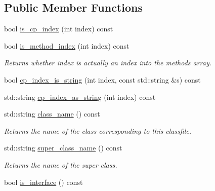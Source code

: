 \subsection*{Public Member Functions}
\begin{DoxyCompactItemize}
\item 
bool \hyperlink{classClassFileImpl_a1f15226f5107cb036e81d480531cda08}{is\+\_\+cp\+\_\+index} (int index) const
\item 
\mbox{\label{classClassFileImpl_ad8f4fcb051aa9d8c04d67373abe12c43}} 
bool \hyperlink{classClassFileImpl_ad8f4fcb051aa9d8c04d67373abe12c43}{is\+\_\+method\+\_\+index} (int index) const
\begin{DoxyCompactList}\small\item\em Returns whether {\ttfamily index} is actually an index into the methods array. \end{DoxyCompactList}\item 
bool \hyperlink{classClassFileImpl_ab84cd50d25d163274a299ba682f57610}{cp\+\_\+index\+\_\+is\+\_\+string} (int index, const std\+::string \&s) const
\item 
std\+::string \hyperlink{classClassFileImpl_abf8923075c93d6d5bd1755a7b3ced362}{cp\+\_\+index\+\_\+as\+\_\+string} (int index) const
\item 
\mbox{\label{classClassFileImpl_a6b505e3750863370ca70c708d051a00c}} 
std\+::string \hyperlink{classClassFileImpl_a6b505e3750863370ca70c708d051a00c}{class\+\_\+name} () const
\begin{DoxyCompactList}\small\item\em Returns the name of the class corresponding to this classfile. \end{DoxyCompactList}\item 
\mbox{\label{classClassFileImpl_afd7229efcf341804086bcf6c00bb4820}} 
std\+::string \hyperlink{classClassFileImpl_afd7229efcf341804086bcf6c00bb4820}{super\+\_\+class\+\_\+name} () const
\begin{DoxyCompactList}\small\item\em Returns the name of the super class. \end{DoxyCompactList}\item 
\mbox{\label{classClassFileImpl_ade64e9cb17003aa71ef596785ab8c575}} 
bool \hyperlink{classClassFileImpl_ade64e9cb17003aa71ef596785ab8c575}{is\+\_\+interface} () const

\end{DoxyCompactItemize}
